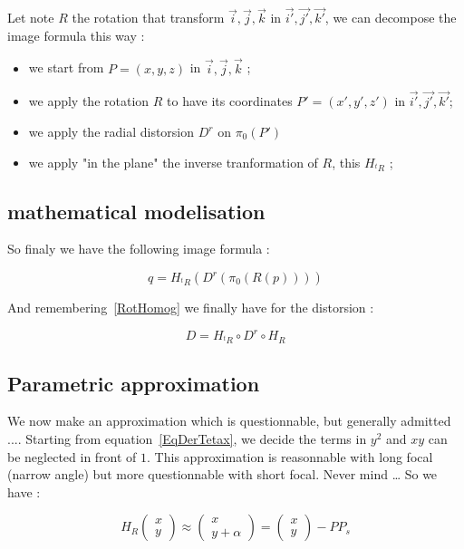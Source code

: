 Let note $R$ the rotation that transform $\vec{i},\vec{j},\vec{k}$ in $\vec{i'},\vec{j'},\vec{k'}$, we can decompose 
the image formula this way :

\begin{itemize}
	\item  we start from  $P=(x,y,z)$  in $\vec{i},\vec{j},\vec{k}$ ;
	\item  we apply the rotation $R$ to have its coordinates $P'=(x',y',z')$ in $\vec{i'},\vec{j'},\vec{k'}$;
         \item we apply the radial  distorsion $D^r$ on $\pi_0(P') $
	 \item we apply "in the plane" the inverse tranformation of $R$, this $H_{^tR}$ ;
\end{itemize}

\subsection{mathematical modelisation}

So finaly we have the following image formula :

\begin{equation}
	q = H_{^tR} (D^r( \pi_0(R(p))))
\end{equation}

And remembering~\ref{RotHomog} we finally have for the distorsion :

\begin{equation}
	D = H_{^tR} \circ  D^r \circ   H_{R} \label{HDH}
\end{equation}


\subsection{Parametric approximation}

We now make an approximation which is questionnable, but generally admitted ....
Starting from equation~\ref{EqDerTetax}, we decide the terms in $y^2$
and $xy$ can be neglected in front of $1$.  This approximation is reasonnable
with long focal (narrow angle) but more questionnable with short focal.  Never mind \dots
So we have :


\begin{equation}
	H_{R}\begin{pmatrix} x \\ y \end{pmatrix}  \approx \begin{pmatrix} x \\ y  +\alpha \end{pmatrix}
		= \begin{pmatrix} x \\ y  \end{pmatrix} - PP_s
\end{equation}

